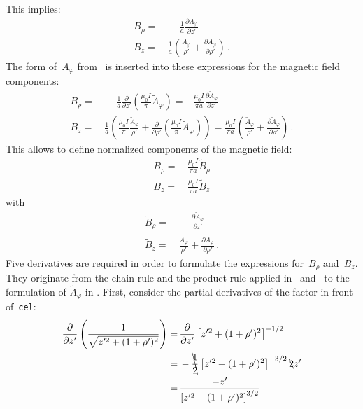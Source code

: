 This implies:
\begin{align}
  B_\rho =&\, - \frac{1}{a} \frac{\partial A_\varphi}{\partial z'} \\
  B_z    =&\, \frac{1}{a} \left( \frac{A_\varphi}{\rho'} + \frac{\partial A_\varphi}{\partial \rho'} \right) \, .
\end{align}
The form of~$A_\varphi$ from~ is inserted into these expressions
for the magnetic field components:
\begin{align}
  B_\rho =&\, - \frac{1}{a} \frac{\partial}{\partial z'} \left( \frac{\mu_0 I}{\pi} \tilde{A}_\varphi \right)
         =    - \frac{\mu_0 I}{\pi a} \frac{\partial \tilde{A}_\varphi}{\partial z'} \\
  B_z    =&\, \frac{1}{a} \left( \frac{\mu_0 I}{\pi} \frac{\tilde{A}_\varphi}{\rho'} + \frac{\partial}{\partial \rho'} \left( \frac{\mu_0 I}{\pi} \tilde{A}_\varphi \right) \right)
         =    \frac{\mu_0 I}{\pi a} \left(\frac{\tilde{A}_\varphi}{\rho'} + \frac{\partial \tilde{A}_\varphi}{\partial \rho'} \right) \, .
\end{align}
This allows to define normalized components of the magnetic field:
\begin{align}
  B_\rho =&\, \frac{\mu_0 I}{\pi a} \tilde{B}_\rho \\
  B_z    =&\, \frac{\mu_0 I}{\pi a} \tilde{B}_z
\end{align}
with
\begin{align}
  \tilde{B}_\rho =&\, - \frac{\partial \tilde{A}_\varphi}{\partial z'}                                    \label{eqn:cwl_norm_B_rho} \\
  \tilde{B}_z    =&\, \frac{\tilde{A}_\varphi}{\rho'} + \frac{\partial \tilde{A}_\varphi}{\partial \rho'} \label{eqn:cwl_norm_B_z}   \, .
\end{align}
Five derivatives are required in order to formulate the expressions for~$B_\rho$ and~$B_z$.
They originate from the chain rule and the product rule applied in~ and~
to the formulation of $\tilde{A}_\varphi$ in .
First, consider the partial derivatives of the factor in front of~\texttt{cel}:
\begin{align}
      \frac{\partial}{\partial z'} \left( \frac{1}{\sqrt{z'^2 + (1 + \rho')^2}} \right)
 =&\, \frac{\partial}{\partial z'} \left[ z'^2 + (1 + \rho')^2 \right]^{-1/2} \nonumber \\
 =&\, - \bcancel{\frac{1}{2}} \left[ z'^2 + (1 + \rho')^2 \right]^{-3/2} \bcancel{2} z' \nonumber \\
 =&\, \frac{- z'}{\left[ z'^2 + (1 + \rho')^2 \right]^{3/2} }
\end{align}
